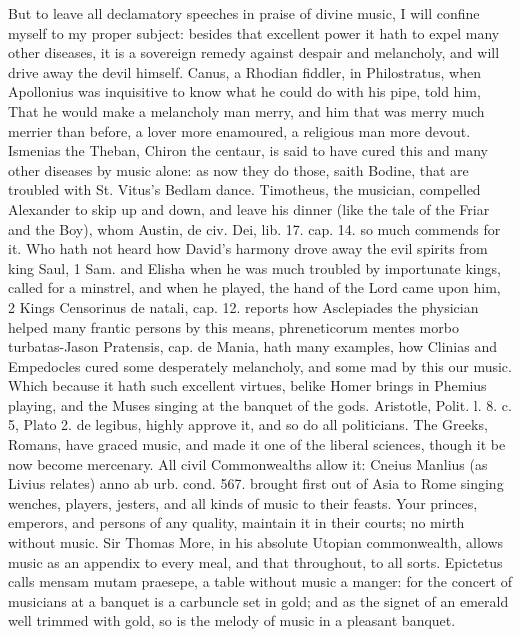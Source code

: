 {But to leave all declamatory speeches in praise of divine music,
I will confine myself to my proper subject: besides that excellent
power it hath to expel many other diseases, it is a sovereign remedy
against  despair and melancholy, and will drive away the devil
himself. Canus, a Rhodian fiddler, in Philostratus, when
Apollonius was inquisitive to know what he could do with his pipe, told
him, That he would make a melancholy man merry, and him that was merry
much merrier than before, a lover more enamoured, a religious man more
devout. Ismenias the Theban, Chiron the centaur, is said to have
cured this and many other diseases by music alone: as now they do
those, saith Bodine, that are troubled with St. Vitus's Bedlam
dance. Timotheus, the musician, compelled Alexander to skip up
and down, and leave his dinner (like the tale of the Friar and the
Boy), whom Austin, de civ. Dei, lib. 17. cap. 14. so much commends for
it. Who hath not heard how David's harmony drove away the evil spirits
from king Saul, 1 Sam.  and Elisha when he was much troubled by
importunate kings, called for a minstrel, and when he played, the hand
of the Lord came upon him, 2 Kings  Censorinus de natali, cap. 12.
reports how Asclepiades the physician helped many frantic persons by
this means, phreneticorum mentes morbo turbatas-Jason Pratensis, cap.
de Mania, hath many examples, how Clinias and Empedocles cured some
desperately melancholy, and some mad by this our music. Which because
it hath such excellent virtues, belike Homer brings in Phemius
playing, and the Muses singing at the banquet of the gods. Aristotle,
Polit. l. 8. c. 5, Plato 2. de legibus, highly approve it, and so do
all politicians. The Greeks, Romans, have graced music, and made it one
of the liberal sciences, though it be now become mercenary. All civil
Commonwealths allow it: Cneius Manlius (as Livius relates) anno
ab urb. cond. 567. brought first out of Asia to Rome singing wenches,
players, jesters, and all kinds of music to their feasts. Your princes,
emperors, and persons of any quality, maintain it in their courts; no
mirth without music. Sir Thomas More, in his absolute Utopian
commonwealth, allows music as an appendix to every meal, and that
throughout, to all sorts. Epictetus calls mensam mutam praesepe, a
table without music a manger: for the concert of musicians at a banquet
is a carbuncle set in gold; and as the signet of an emerald well
trimmed with gold, so is the melody of music in a pleasant banquet.

}
